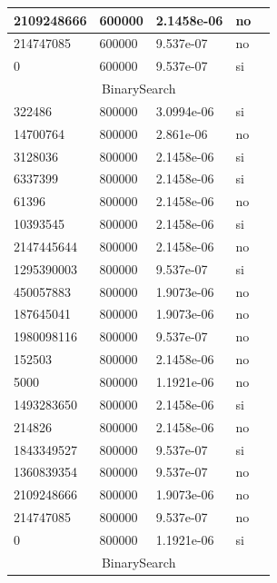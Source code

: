 \documentclass[12pt, fleqn]{article}                             %
\theoremstyle{break}                                            %
\begin{document}
\begin{longtable}{|m{5em}|m{5em}|m{10em}|m{5em}|@{}m{0pt}@{}}
            2109248666& 600000  & 2.1458e-06 & no &\\[1em]    \hline
            214747085& 600000  & 9.537e-07 & no &\\[1em]    \hline
            0& 600000  & 9.537e-07 & si &\\[1em]    \hline
            \multicolumn{5}{|c|}{BinarySearch}   \\          \hline
            322486& 800000  & 3.0994e-06 & si &\\[1em]    \hline
            14700764& 800000  & 2.861e-06 & no &\\[1em]    \hline
            3128036& 800000  & 2.1458e-06 & si &\\[1em]    \hline
            6337399& 800000  & 2.1458e-06 & si &\\[1em]    \hline
            61396& 800000  & 2.1458e-06 & no &\\[1em]    \hline
            10393545& 800000  & 2.1458e-06 & si &\\[1em]    \hline
            2147445644& 800000  & 2.1458e-06 & no &\\[1em]    \hline
            1295390003& 800000  & 9.537e-07 & si &\\[1em]    \hline
            450057883& 800000  & 1.9073e-06 & no &\\[1em]    \hline
            187645041& 800000  & 1.9073e-06 & no &\\[1em]    \hline
            1980098116& 800000  & 9.537e-07 & no &\\[1em]    \hline
            152503& 800000  & 2.1458e-06 & no &\\[1em]    \hline
            5000& 800000  & 1.1921e-06 & no &\\[1em]    \hline
            1493283650& 800000  & 2.1458e-06 & si &\\[1em]    \hline
            214826& 800000  & 2.1458e-06 & no &\\[1em]    \hline
            1843349527& 800000  & 9.537e-07 & si &\\[1em]    \hline
            1360839354& 800000  & 9.537e-07 & no &\\[1em]    \hline
            2109248666& 800000  & 1.9073e-06 & no &\\[1em]    \hline
            214747085& 800000  & 9.537e-07 & no &\\[1em]    \hline
            0& 800000  & 1.1921e-06 & si &\\[1em]    \hline
            \multicolumn{5}{|c|}{BinarySearch}   \\          \hline

\end{longtable}
\end{document}

